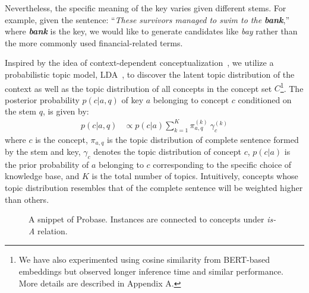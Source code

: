 Nevertheless, the specific meaning of the key varies given different stems. For example, given the sentence: ``\textit{These survivors managed to swim to the \textbf{bank}},'' where \textit{\textbf{bank}} is the key, we would like to generate candidates like \textit{bay} rather than the more commonly used 
financial-related terms.

Inspired by the idea of context-dependent conceptualization~\cite{kim2013context}, we utilize a probabilistic topic model, LDA~\cite{Blei:2003:LDA:944919.944937}, to discover the latent topic distribution of the context as well as the topic distribution of all concepts in the concept set $C$\footnote{We have also experimented using cosine similarity from BERT-based embeddings but observed longer inference time and similar performance. More details are described in Appendix A.}. The posterior probability $p(c|a, q)$
of key $a$ belonging to concept $c$ conditioned on the stem $q$, is given by: 
\begin{align}
	p(c|a, q) &\propto p(c|a) \sum_{k=1}^K \pi_{a,q}^{(k)} ~ \gamma_{c}^{(k)}
	\label{eq:pc}
\end{align}
where $c$ is the concept, $\pi_{a,q}$ is the topic distribution of complete sentence formed by the stem and key, $\gamma_{c}$ denotes the topic distribution of concept $c$, $p(c|a)$ is the prior probability of $a$ belonging to $c$ corresponding to the specific choice of knowledge base, 
and $K$ is the total number of topics. 
Intuitively, concepts whose topic distribution resembles that of the complete sentence will be weighted higher than others.
\begin{figure}[t]
\centering
{}
\caption{A snippet of Probase. Instances are connected to concepts under \textit{is-A} relation.} \label{fig:probase}
\end{figure}
